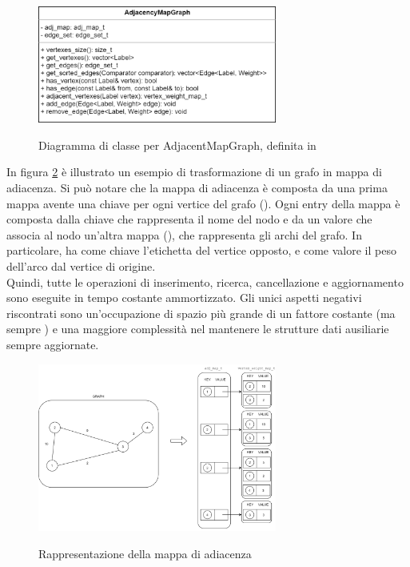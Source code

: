 \begin{figure}[h]
	\caption{Diagramma di classe per AdjacentMapGraph, definita in }
	\centering
	\includegraphics[width=0.7\textwidth]{./images/AdjancencyMapGrapClass.png}
	\label{fig:AdjMapGraph Class}
\end{figure}

\noindent In figura \ref{fig:AdjMapGraph Abstract} è illustrato un esempio di trasformazione di un grafo in mappa di adiacenza. Si può notare che la mappa di adiacenza è composta da una prima mappa avente una chiave per ogni vertice del grafo (). Ogni entry della mappa è composta dalla chiave che rappresenta il nome del nodo e da un valore che associa al nodo un'altra mappa (), che rappresenta gli archi del grafo.
In particolare,  ha come chiave l'etichetta del vertice opposto, e come valore il peso dell'arco dal vertice di origine. \\

\noindent Quindi, tutte le operazioni di inserimento, ricerca, cancellazione e aggiornamento sono eseguite in tempo costante ammortizzato. Gli unici aspetti negativi riscontrati sono un'occupazione di spazio più grande di un fattore costante (ma sempre \complexityNPlusM{}) e una maggiore complessità nel mantenere le strutture dati ausiliarie sempre aggiornate. \\

\begin{figure}[h]
	\caption{Rappresentazione della mappa di adiacenza}
	\centering
	\includegraphics[width=0.7\textwidth]{./images/AdjMapGraphAbstract.png}
	\label{fig:AdjMapGraph Abstract}
\end{figure}

